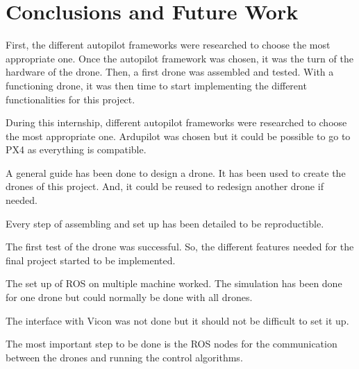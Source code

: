 \chapter{Conclusions and Future Work}

First, the different autopilot frameworks were researched to choose the most appropriate one.
Once the autopilot framework was chosen, it was the turn of the hardware of the drone.
Then, a first drone was assembled and tested.
With a functioning drone, it was then time to start implementing the different functionalities for this project.


During this internship, different autopilot frameworks were researched to choose the most appropriate one.
Ardupilot was chosen but it could be possible to go to PX4 as everything is compatible.

A general guide has been done to design a drone. It has been used to create the drones of this project.
And, it could be reused to redesign another drone if needed.

Every step of assembling and set up has been detailed to be reproductible.

The first test of the drone was successful.
So, the different features needed for the final project started to be implemented.

The set up of ROS on multiple machine worked.
The simulation has been done for one drone but could normally be done with all drones.

The interface with Vicon was not done but it should not be difficult to set it up.

The most important step to be done is the ROS nodes for the communication between the drones and running the control algorithms.